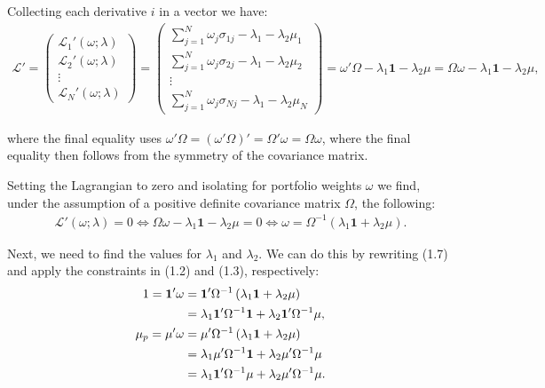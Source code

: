 \documentclass[11pt,a4paper,oneside]{article}
\newcommand{\lll}{\mathcal{L}}
\newcommand{\LL}{\Leftrightarrow}
\newcommand{\lp}{\left(}
\newcommand{\rp}{\right)}
\begin{document}
Collecting each derivative $i$ in a vector we have:
\begin{align}
    \lll' =
    \begin{pmatrix}
        \lll_1'\lp \omega;\lambda\rp\\
        \lll_2'\lp \omega;\lambda\rp\\
        \vdots\\
        \lll_N'\lp \omega;\lambda\rp
    \end{pmatrix}
    = 
    \begin{pmatrix}
        \sum_{j=1}^N\omega_j\sigma_{1j} - \lambda_1 - \lambda_2 \mu_1\\
        \sum_{j=1}^N\omega_j\sigma_{2j} - \lambda_1 - \lambda_2 \mu_2\\
        \vdots\\
        \sum_{j=1}^N\omega_j\sigma_{Nj} - \lambda_1 - \lambda_2 \mu_N
    \end{pmatrix}
    = \omega ' \Omega - \lambda_1 \mathbf{1} - \lambda_2 \mu = \Omega \omega - \lambda_1 \mathbf{1} - \lambda_2 \mu,
\end{align}

where the final equality uses $\omega' \Omega = (\omega'\Omega)' = \Omega'\omega = \Omega \omega$, where the final equality then follows from the symmetry of the covariance matrix.

Setting the Lagrangian to zero and isolating for portfolio weights $\omega$ we find, under the assumption of a positive definite covariance matrix $\Omega$, the following:
\begin{align}
    \lll'\lp \omega;\lambda \rp = 0 \LL \Omega \omega - \lambda_1 \mathbf{1} - \lambda_2 \mu = 0 \LL \omega = \Omega^{-1} \lp \lambda_1 \mathbf{1} + \lambda_2 \mu \rp.
\end{align}

Next, we need to find the values for $\lambda_1$ and $\lambda_2$. We can do this by rewriting (1.7) and apply the constraints in (1.2) and (1.3), respectively:
\begin{align}
    1 
        = \mathbf{1}'\omega 
        &= \mathbf{1}'\Omega^{-1} \lp \lambda_1 \mathbf{1} + \lambda_2 \mu \rp \notag \\
        &= \lambda_1\mathbf{1}'\Omega^{-1}\mathbf{1} + \lambda_2 \mathbf{1}'\Omega^{-1} \mu, \\
    \mu_p 
        = \mu'\omega
        &= \mu' \Omega^{-1} \lp \lambda_1 \mathbf{1} + \lambda_2 \mu \rp \notag \\
        &= \lambda_1 \mu' \Omega^{-1} \mathbf{1} + \lambda_2 \mu' \Omega^{-1} \mu \notag \\
        &= \lambda_1 \mathbf{1}' \Omega^{-1} \mu + \lambda_2 \mu' \Omega^{-1} \mu.
\end{align}
\end{document}
